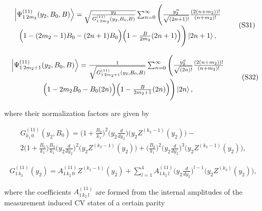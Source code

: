 \documentclass{optica-article}
\begin{document}
\begin{equation}\label{eq:S31}
    \begin{array}{c}
         \ket{\Psi_{1\,2m_2}^{(11)}(y_2,B_0,B)} =
         \sqrt{\frac{y_2}{G_{1\,2m_2}^{(11)}(y_2,B_0,B)}}\sum_{n=0}^{\infty} \Bigg (\frac{y_2^{n}}{\sqrt{(2n+1)!}}
         \frac{(2(n+m_2))!}{(n+m_2)!}\\
         \Big(1-(2m_2-1)B_0-(2n+1)B_0\Big)\Big(1-\frac{B}{2m_2}(2n+1)\Big)\Bigg)\ket{2n+1},
    \end{array}
    \tag{S31}
\end{equation}



\begin{equation}\label{eq:S32}
    \begin{array}{c}
         \ket{\Psi_{1\,2m_2+1}^{(11)}(y_2,B_0,B)} =
         \frac{1}{\sqrt{G_{1\,2m_2+1}^{(11)}(y_2,B_0,B)}}\sum_{n=0}^{\infty} \Bigg (\frac{y_2^{n}}{\sqrt{(2n)!}}
         \frac{(2(n+m_2))!}{(n+m_2)!}\\
         \Big(1-2m_2B_0-B_0(2n)\Big)\Big(1-\frac{B}{2m_2+1}(2n)\Big)\Bigg)\ket{2n},
    \end{array}
    \tag{S32}
\end{equation}


\!\!\!\!\!\!where their normalization factors are given by

\begin{equation}\label{eq:S33}
\begin{array}{c}
         G_{k_1\,0}^{(11)}(y_2,B_0) = \Big(1+\frac{B_0}{k_1}\Big)^2\Big(y_2\frac{d}{dy_2}\Big)\Big(y_2Z^{(k_2-1)}(y_2)\Big)- \\
         2\Big(1+\frac{B_0}{k_1}\Big)\frac{B_0}{k_1}\Big(y_2\frac{d}{dy_2}\Big)^2\Big(y_2Z^{(k_2-1)}(y_2)\Big)+
         \Big(\frac{B_0}{k_1}\Big)^2\Big(y_2\frac{d}{dy_2}\Big)^3\Big(y_2Z^{(k_2-1)}(y_2)\Big),
    \end{array}
\tag{S33}
\end{equation}


\begin{equation}\label{eq:S34}
\begin{array}{c}
         G_{1\,k_2}^{(11)}(y_2) = A^{(11)}_{1\,k_2\,0}Z^{(k_2-1)}(y_2) + \sum_{l=1}^{4}A^{(11)}_{1\,k_2\,l}
        \Big(y_2\frac{d}{dy_2}\Big)^{l-1}\Big(y_2Z^{(k_2)}(y_2)\Big) , 
    \end{array}
\tag{S34}
\end{equation}


where the coefficients $A_{1\,k_2\,l}^{(11)}$ are formed from the internal amplitudes of the measurement induced CV states of a certain parity 
\end{document}
